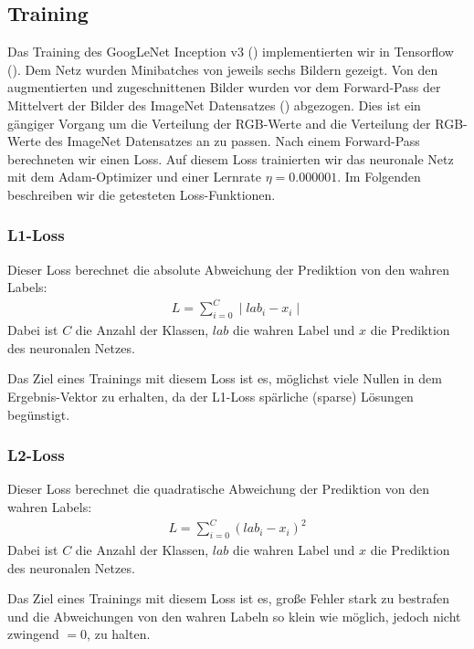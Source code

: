 \subsection{Training}

	Das Training des GoogLeNet Inception v3 (\cite{inception}) implementierten wir in Tensorflow (\cite{tensorflow2015-whitepaper}). Dem Netz wurden Minibatches von jeweils sechs Bildern gezeigt. Von den augmentierten und zugeschnittenen Bilder wurden vor dem Forward-Pass der Mittelvert der Bilder des ImageNet  Datensatzes (\cite{russakovsky2015imagenet}) abgezogen. Dies ist ein gängiger Vorgang um die Verteilung der RGB-Werte and die Verteilung der RGB-Werte des ImageNet Datensatzes an zu passen. Nach einem Forward-Pass berechneten wir einen Loss. Auf diesem Loss trainierten wir das neuronale Netz mit dem Adam-Optimizer und einer Lernrate $\eta=0.000001$. Im Folgenden beschreiben wir die getesteten Loss-Funktionen.
	
\subsubsection{L1-Loss}

	Dieser Loss berechnet die absolute Abweichung der Prediktion von den wahren Labels:
	\begin{align*}
		L = \sum_{i = 0}^C \mid lab_i - x_i\mid
	\end{align*}
	Dabei ist $C$ die Anzahl der Klassen, $lab$ die wahren Label und $x$ die Prediktion des neuronalen Netzes.
	
	Das Ziel eines Trainings mit diesem Loss ist es, möglichst viele Nullen in dem Ergebnis-Vektor zu erhalten, da der L1-Loss spärliche (sparse) Lösungen begünstigt.

\subsubsection{L2-Loss}
	Dieser Loss berechnet die quadratische Abweichung der Prediktion von den wahren Labels:
	\begin{align*}
	L = \sum_{i = 0}^C ( lab_i - x_i)^2
	\end{align*}
	Dabei ist $C$ die Anzahl der Klassen, $lab$ die wahren Label und $x$ die Prediktion des neuronalen Netzes.
	
	Das Ziel eines Trainings mit diesem Loss ist es, große Fehler stark zu bestrafen und die Abweichungen von den wahren Labeln so klein wie möglich, jedoch nicht zwingend $=0$, zu halten.
	
